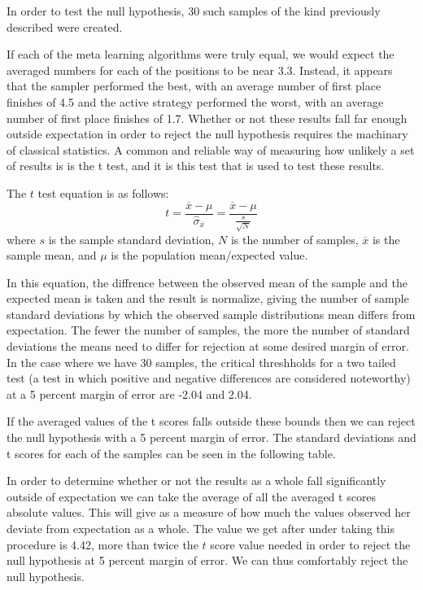 In order to test the null hypothesis, 30 such samples of the kind previously
described were created.

If each of the meta learning algorithms were truly equal, we would expect the
averaged numbers for each of the positions to be near 3.3. Instead, it appears
that the sampler performed the best, with an average number of first place
finishes of 4.5 and the active strategy performed the worst, with an average
number of first place finishes of 1.7. Whether or not these results fall far
enough outside expectation in order to reject the null hypothesis requires the
machinary of classical statistics. A common and reliable way of  measuring
how unlikely a set of results is is the t test, and it is this test that is used
to test these results.

The $t$ test equation is as follows:
$$t =\frac{\overline{x}-\mu}{\hat{\sigma}_{\overline{x}}} = \frac{\overline{x}-\mu}{\frac{s}{\sqrt{N}}}$$
where $s$ is the sample standard deviation, $N$ is the number of samples,
$\overline{x}$ is the  sample mean, and $\mu$ is the population mean/expected value.

In this equation, the diffrence between the observed mean of the sample
and the expected mean is taken and the result is normalize, giving the number
of sample standard deviations by which the observed sample distributions mean
differs from expectation. The fewer the number of samples, the more the number
of standard deviations the means need to differ for rejection at some desired
margin of error. In the case where we have 30 samples, the critical threshholds
for a two tailed test (a test in which positive and negative differences are
considered noteworthy) at a 5 percent margin of error are -2.04 and 2.04.

If the averaged values of the t scores falls outside these bounds then we can
reject the null hypothesis with a 5 percent margin of error. The standard
deviations and t scores for each of the samples can be seen in the following
table.

In order to determine whether or not the results as a whole fall significantly
outside of expectation we can take the average of all the averaged t scores
absolute values. This will give as a measure of how much the values observed her
deviate from expectation as a whole. The value we get after under taking this
procedure is 4.42, more than twice the $t$ score value needed in order to
reject the null hypothesis at 5 percent margin of error. We can thus comfortably
reject the null hypothesis.

